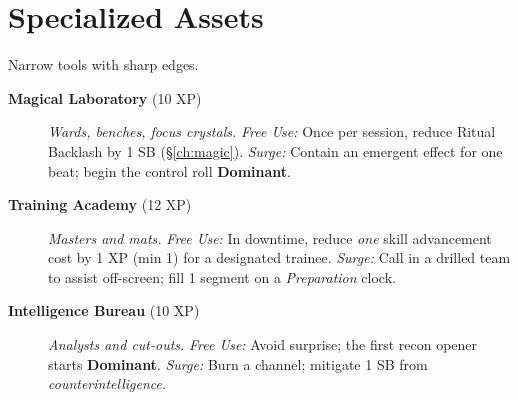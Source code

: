 \section{Specialized Assets}
Narrow tools with sharp edges.
\begin{description}
  \item[\textbf{Magical Laboratory} (10 XP)]  \emph{Wards, benches, focus crystals.} \emph{Free Use:} Once per session, reduce Ritual Backlash by 1 SB (\S\ref{ch:magic}). \emph{Surge:} Contain an emergent effect for one beat; begin the control roll \textbf{Dominant}.

  \item[\textbf{Training Academy} (12 XP)]  \emph{Masters and mats.} \emph{Free Use:} In downtime, reduce \emph{one} skill advancement cost by 1 XP (min 1) for a designated trainee. \emph{Surge:} Call in a drilled team to assist off-screen; fill 1 segment on a \emph{Preparation} clock.

  \item[\textbf{Intelligence Bureau} (10 XP)]  \emph{Analysts and cut-outs.} \emph{Free Use:} Avoid surprise; the first recon opener starts \textbf{Dominant}. \emph{Surge:} Burn a channel; mitigate 1 SB from \emph{counterintelligence}.
\end{description}

